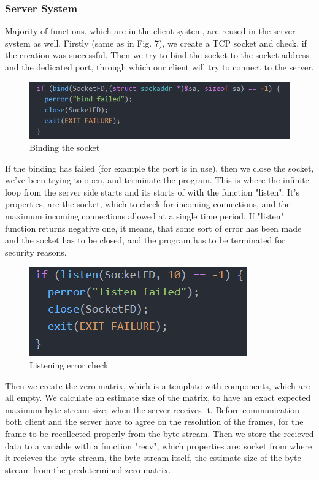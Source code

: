 \documentclass[conference]{IEEEtran}
\begin{document}
\subsubsection{Server System}
Majority of functions, which are in the client system, are reused in the server system as well. Firstly (same as in Fig. 7), we create a TCP socket and check, if the creation was successful. Then we try to bind the socket to the socket address and the dedicated port, through which our client will try to connect to the server.
\begin{figure}[h!]
	\includegraphics[width=\linewidth]{ServerCodeExample1.png}
	\caption{Binding the socket}
	\label{fig:SCE1}
\end{figure}
 If the binding has failed (for example the port is in use), then we close the socket, we've been trying to open, and terminate the program.
\newline
This is where the infinite loop from the server side starts and its starts of with the function "listen". It's properties, are the socket, which to check for incoming connections, and the maximum incoming connections allowed at a single time period. If "listen" function returns negative one, it means, that some sort of error has been made and the socket has to be closed, and the program has to be terminated for security reasons.
\begin{figure}[h!]
	\includegraphics[width=\linewidth]{ServerCodeExample2.png}
	\caption{Listening error check}
	\label{fig:SCE2}
\end{figure}
\newline
Then we create the zero matrix, which is a template with components, which are all empty. We calculate an estimate size of the matrix, to have an exact expected maximum byte stream size, when the server receives it. Before communication both client and the server have to agree on the resolution of the frames, for the frame to be recollected properly from the byte stream. Then we store the recieved data to a variable with a function "recv", which properties are: socket from where it recieves the byte stream, the byte stream itself, the estimate size of the byte stream from the predetermined zero matrix.
\end{document}
